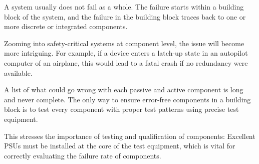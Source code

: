 A system usually does not fail as a whole.
The failure starts within a building block of the system, and the failure in the
building block traces back to one or more discrete or integrated components.

Zooming into safety-critical systems at component level, the issue will become
more intriguing.
For example, if a device enters a latch-up state in an autopilot computer of an
airplane, this would lead to a fatal crash if no redundancy were available.

A list of what could go wrong with each passive and active component is long and
never complete.
The only way to ensure error-free components in a building block is to test
every component with proper test patterns using precise test equipment.

This stresses the importance of testing and qualification of components:
Excellent \acp{PSU} must be installed at the core of the test equipment, which
is vital for correctly evaluating the failure rate of components.










